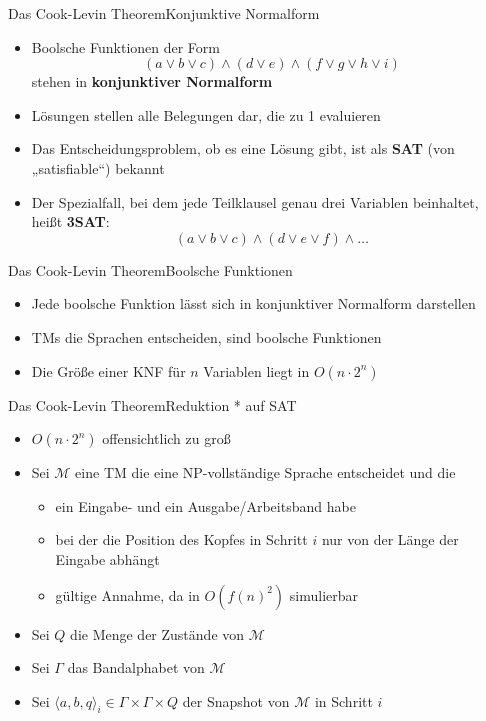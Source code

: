 \documentclass[ignorenonframetext,]{beamer}
\begin{document}
\begin{frame}{Das Cook-Levin Theorem}{Konjunktive Normalform}

\begin{itemize}
\itemsep1pt\parskip0pt
\item
  Boolsche Funktionen der Form
  \[(a \vee b \vee c) \wedge (d \vee e) \wedge (f \vee g \vee h \vee i)\]
  stehen in \textbf{konjunktiver Normalform}
\item
  Lösungen stellen alle Belegungen dar, die zu 1 evaluieren
\item
  Das Entscheidungsproblem, ob es eine Lösung gibt, ist als \textbf{SAT}
  (von „satisfiable``) bekannt
\item
  Der Spezialfall, bei dem jede Teilklausel genau drei Variablen
  beinhaltet, heißt \textbf{3SAT}:
  \[(a \vee b \vee c) \wedge (d \vee e \vee f) \wedge \dots\]
\end{itemize}

\end{frame}

\begin{frame}{Das Cook-Levin Theorem}{Boolsche Funktionen}

\begin{itemize}
\itemsep1pt\parskip0pt
\item
  Jede boolsche Funktion lässt sich in konjunktiver Normalform
  darstellen
\item
  TMs die Sprachen entscheiden, sind boolsche Funktionen
\item
  Die Größe einer KNF für $n$ Variablen liegt in $O(n \cdot 2^n)$
\end{itemize}

\end{frame}

\begin{frame}{Das Cook-Levin Theorem}{Reduktion * auf SAT}

\begin{itemize}
\itemsep1pt\parskip0pt
\item
  $O(n \cdot 2^n)$ offensichtlich zu groß
\item
  Sei $\mathcal{M}$ eine TM die eine NP-vollständige Sprache entscheidet
  und die

  \begin{itemize}
  \itemsep1pt\parskip0pt
  \item
    ein Eingabe- und ein Ausgabe/Arbeitsband habe
  \item
    bei der die Position des Kopfes in Schritt $i$ nur von der Länge der
    Eingabe abhängt
  \item
    gültige Annahme, da in $O(f(n)^2)$ simulierbar
  \end{itemize}
\item
  Sei $Q$ die Menge der Zustände von $\mathcal{M}$
\item
  Sei $\Gamma$ das Bandalphabet von $\mathcal{M}$
\item
  Sei $\langle a, b, q\rangle_i \in \Gamma\times \Gamma\times Q$ der
  Snapshot von $\mathcal{M}$ in Schritt $i$
\end{itemize}

\end{frame}
\end{document}
